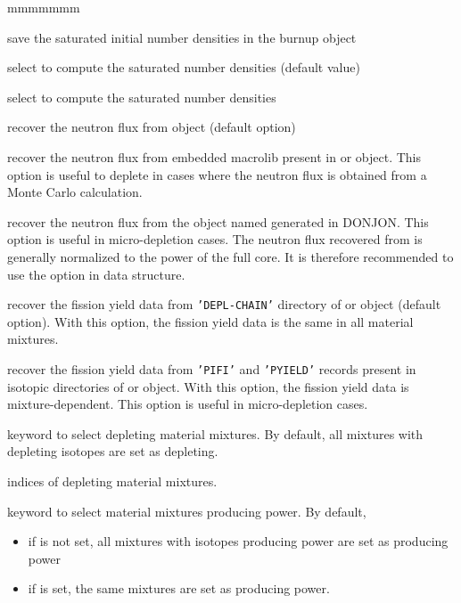 \begin{ListeDeDescription}{mmmmmmm}
\item[\moc{SAT}]  save the saturated initial number densities in the {\sc burnup}
object 

\item[\moc{NODI}]  select  to compute the saturated number densities
(default value)

\item[\moc{DIRA}]  select  to compute the saturated number densities

\item[\moc{FLUX\_FLUX}]  recover the neutron flux from  object (default option)

\item[\moc{FLUX\_MAC}]  recover the neutron flux from embedded macrolib present in  or 
object. This option is useful to deplete in cases where the neutron flux is obtained from a Monte Carlo
calculation.

\item[\moc{FLUX\_POW}]  recover the neutron flux from the  object named  generated in DONJON. This option is useful in
micro-depletion cases. The neutron flux recovered from  is generally normalized to the power of the full core. It is therefore
recommended to use the  option in  data structure.

\item[\moc{CHAIN}]  recover the fission yield data from {\tt 'DEPL-CHAIN'} directory of  or 
object (default option). With this option, the fission yield data is the same in all material mixtures.

\item[\moc{PIFI}]  recover the fission yield data from {\tt 'PIFI'} and {\tt 'PYIELD'} records present in isotopic directories
of  or  object. With this option, the fission yield data is mixture-dependent. This option is useful
in micro-depletion cases.

\item[\moc{MIXB}]  keyword to select depleting material mixtures. By default, all mixtures
with depleting isotopes are set as depleting.

\item[\dusa{mixbrn}] indices of depleting material mixtures.

\item[\moc{MIXP}]  keyword to select material mixtures producing power. By default, 
\begin{itemize}
\item if  is not set, all mixtures with isotopes producing power are set as producing power
\item if  is set, the same mixtures  are set as producing power.
\end{itemize}


\end{ListeDeDescription}
